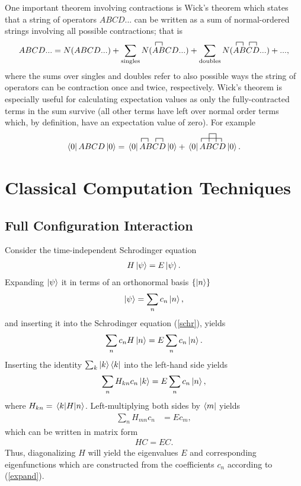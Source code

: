 \documentclass[10pt]{article}
\begin{document}
One important theorem involving contractions is Wick's theorem \cite{ref:wick} which states that a string of operators $ABCD...$ can be written as a sum of normal-ordered strings involving all possible contractions; that is
\begin{align}
ABCD...
=
N(ABCD...)
+
\sum_{\text{singles}}
\contraction{N(}{A}{}{B}
N(ABCD...)
+
\sum_{\text{doubles}}
\contraction{N(}{A}{}{B}
\contraction{N(AB}{C}{}{D}
N(ABCD...)
+
...,
\end{align}
where the sums over singles and doubles refer to also possible ways the string of operators can be contraction once and twice, respectively. Wick's theorem is especially useful for calculating expectation values as only the fully-contracted terms in the sum survive (all other terms have left over normal order terms which, by definition, have an expectation value of zero). For example
\begin{align}
\bra{0}ABCD\ket{0}
=
\contraction{\bra{0}}{A}{}{B}
\contraction{\bra{0}AB}{C}{}{D}
\bra{0}ABCD\ket{0}
+
\contraction{\bra{0}}{A}{BC}{D}
\contraction[1em]{\bra{0}A}{B}{}{C}
\bra{0}ABCD\ket{0}.
\end{align}

\section{Classical Computation Techniques}

\subsection{Full Configuration Interaction}
\label{fci_subsection}

Consider the time-independent Schrodinger equation
\begin{align}
\label{schr}
H\ket{\psi}=E\ket{\psi}.
\end{align}
Expanding $\ket{\psi}$ it in terms of an orthonormal basis $\{\ket{n}\}$
\begin{align}
\label{expand}
\ket{\psi}=\sum_nc_n\ket{n},
\end{align}
and inserting it into the Schrodinger equation (\ref{schr}), yields
\begin{align}
\sum_nc_nH\ket{n}=E\sum_nc_n\ket{n}.
\end{align}
Inserting the identity $\sum_k\ket{k}\bra{k}$ into the left-hand side yields
\begin{align}
\sum_nH_{kn}c_n\ket{k}=E\sum_nc_n\ket{n},
\end{align}
where $H_{kn}=\mel{k}{H}{n}$. Left-multiplying both sides by $\bra{m}$ yields
\begin{align}
\sum_nH_{mn}c_n&=Ec_m,
\end{align}
which can be written in matrix form
\begin{align}
HC=EC.
\end{align}
Thus, diagonalizing $H$ will yield the eigenvalues $E$ and corresponding eigenfunctions which are constructed from the coefficients $c_n$ according to (\ref{expand}).
\end{document}
